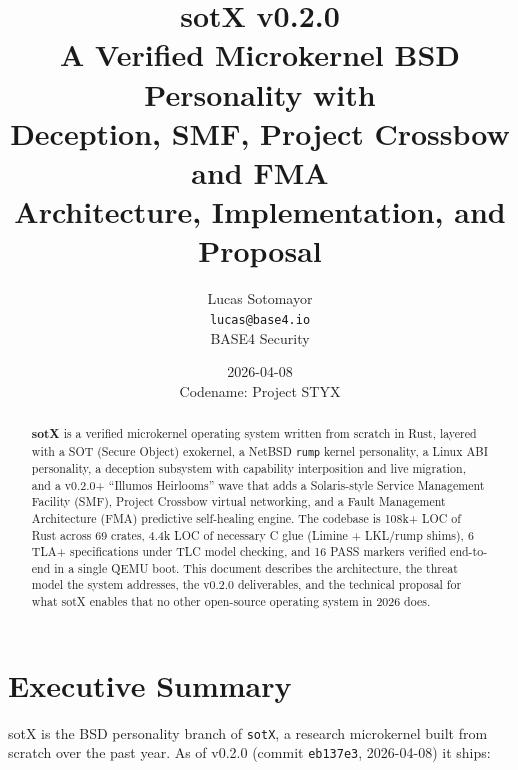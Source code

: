 \documentclass[11pt,a4paper]{article}
\title{
  \vspace{-1.5cm}
  \textbf{sotX v0.2.0} \\[0.4em]
  \large A Verified Microkernel BSD Personality with \\
  Deception, SMF, Project Crossbow and FMA \\[0.6em]
  \normalsize Architecture, Implementation, and Proposal
}
\author{
  Lucas Sotomayor \\
  \texttt{lucas@base4.io} \\
  BASE4 Security
}
\date{2026-04-08 \\ Codename: Project STYX}
\begin{document}

\maketitle
\thispagestyle{empty}

\begin{abstract}
\noindent
\textbf{sotX} is a verified microkernel operating system written from
scratch in Rust, layered with a SOT (Secure Object) exokernel, a NetBSD
\texttt{rump} kernel personality, a Linux ABI personality, a deception
subsystem with capability interposition and live migration, and a v0.2.0+
``Illumos Heirlooms'' wave that adds a Solaris-style Service Management
Facility (SMF), Project Crossbow virtual networking, and a Fault
Management Architecture (FMA) predictive self-healing engine. The
codebase is 108k+ LOC of Rust across 69 crates, 4.4k LOC of necessary
C glue (Limine + LKL/rump shims), 6 TLA+ specifications under TLC model
checking, and 16 PASS markers verified end-to-end in a single QEMU boot.
This document describes the architecture, the threat model the system
addresses, the v0.2.0 deliverables, and the technical proposal for what
sotX enables that no other open-source operating system in 2026 does.
\end{abstract}

\tableofcontents
\newpage

\section{Executive Summary}

sotX is the BSD personality branch of \texttt{sotX}, a research
microkernel built from scratch over the past year. As of v0.2.0
(commit \texttt{eb137e3}, 2026-04-08) it ships:
\end{document}
